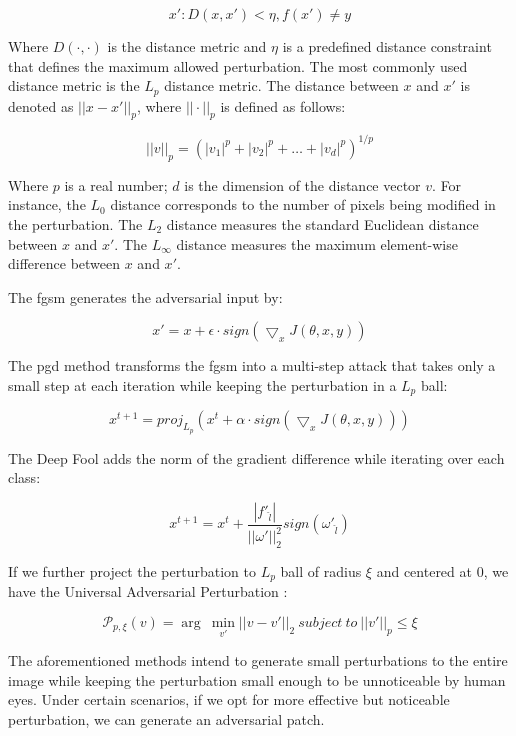 $$x': D(x, x') < \eta, f(x') \neq y $$

Where $D(\cdot, \cdot)$ is the distance metric and $ \eta $ is a predefined distance constraint that defines the maximum allowed perturbation. The most commonly used distance metric is the $L_p$ distance metric. The distance between $x$ and $x'$ is denoted as $||x-x'||_{p}$, where $||\cdot||_p$ is defined as follows:

$$ ||v||_p = (|v_1|^p + |v_2|^p + \dots + |v_d|^p)^{1/p} $$

Where $p$ is a real number; $d$ is the dimension of the distance vector $v$. For instance, the $L_0$ distance corresponds to the number of pixels being modified in the perturbation. The $L_2$ distance measures the standard Euclidean distance between $x$ and $x'$. The $L_\infty$ distance measures the maximum element-wise difference between $x$ and $x'$.

The \acrfull{fgsm} \citep{goodfellow2015explaining} generates the adversarial input by:

$$ x' = x + \epsilon \cdot sign(\bigtriangledown_x J(\theta, x, y)) $$

The \acrfull{pgd} \citep{madry2017towards} method transforms the \acrshort{fgsm} into a multi-step attack that takes only a small step at each iteration while keeping the perturbation in a $L_p$ ball:

$$ x^{t+1} = proj_{L_p}(x^t + \alpha \cdot sign(\bigtriangledown_x J(\theta, x, y))) $$

The Deep Fool \citep{moosavidezfooli2016deepfool} adds the norm of the gradient difference while iterating over each class:

$$ x^{t+1} = x^t + \frac{|f'_{\hat{l}}|}{||\omega'||^2_2} sign(\omega'_{\hat{l}})$$

If we further project the perturbation to $L_p$ ball of radius $\xi$ and centered at 0, we have the Universal Adversarial Perturbation \citep{moosavidezfooli2017universal}:

$$\mathcal{P}_{p, \xi}(v) = \arg\ \underset{v'}{\min}||v-v'||_2\ subject\ to\ ||v'||_p\leq\xi$$


The aforementioned methods intend to generate small perturbations to the entire image while keeping the perturbation small enough to be unnoticeable by human eyes. Under certain scenarios, if we opt for more effective but noticeable perturbation, we can generate an adversarial patch.

